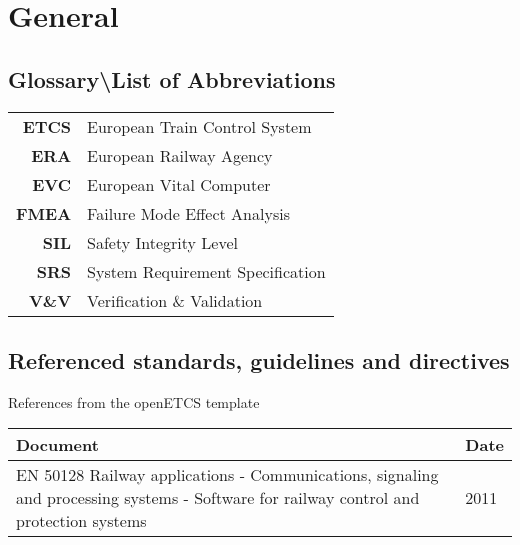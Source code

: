 \section{General}
\subsection{Glossary{\textbackslash}List of Abbreviations}
\label{sec:glossary}



\begin{tabular}{rl}
\label{tab:Glossary} 
\textbf{ETCS} & European Train Control System \\ 
\textbf{ERA} & European Railway Agency \\ 
\textbf{EVC} & European Vital Computer \\ 
\textbf{FMEA} & Failure Mode Effect Analysis \\ 
\textbf{SIL} & Safety Integrity Level \\ 
\textbf{SRS} & System Requirement Specification \\ 
\textbf{V\&V} & Verification \& Validation \\ 
\end{tabular}

\bigskip

\bigskip

\subsection{Referenced standards, guidelines and directives}
{\textbullet} References from the openETCS template


\bigskip




\begin{tabular}{ | p{10cm} | p{5cm} | }
\hline 
Document & Date \\\hline
EN 50128 Railway applications - Communications, signaling and processing systems - Software for railway control and
protection systems &2011\\\hline
\end{tabular}
\label{tab:documents}
